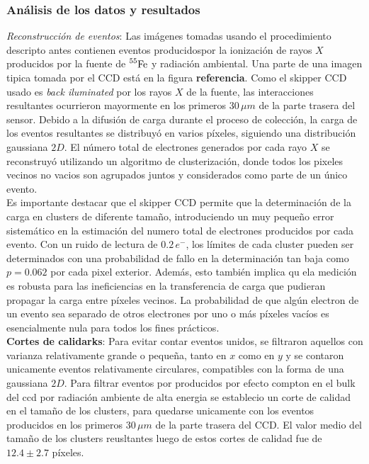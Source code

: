 \subsubsection{Análisis de los datos y resultados}
\textit{Reconstrucción de eventos}: Las imágenes tomadas usando el procedimiento descripto antes contienen eventos producidospor la ionización de rayos $X$ producidos por la fuente de $\prescript{55}{}{\mbox{Fe}}$ y radiación ambiental. Una parte de una imagen tipica tomada por el CCD está en la figura \textbf{referencia}. Como el skipper CCD usado es \textit{back iluminated} por los rayos $X$ de la fuente, las interacciones resultantes ocurrieron mayormente en los primeros $30\,\si{\mu m}$ de la parte trasera del sensor. Debido a la difusión de carga durante el proceso de colección, la carga de los eventos resultantes se distribuyó en varios píxeles, siguiendo una distribución gaussiana $2D$. El número total de electrones generados por cada rayo $X$ se reconstruyó utilizando un algoritmo de clusterización, donde todos los pixeles vecinos no vacios son agrupados juntos y considerados como parte de un único evento.\\
\indent Es importante destacar que el skipper CCD permite que la determinación de la carga en clusters de diferente tamaño, introduciendo un muy pequeño error sistemático en la estimación del numero total de electrones producidos por cada evento. Con un ruido de lectura de $0.2\,e^{-}$, los límites de cada cluster pueden ser determinados con una probabilidad de fallo en la determinación tan baja como $p = 0.062$ por cada pixel exterior. Además, esto también implica qu ela medición es robusta para las ineficiencias en la transferencia de carga que pudieran propagar la carga entre píxeles vecinos. La probabilidad de que algún electron de un evento sea separado de otros electrones por uno o más píxeles vacíos es esencialmente nula para todos los fines prácticos.\\
\indent \textbf{Cortes de calidarks}: Para evitar contar eventos unidos, se filtraron aquellos con varianza relativamente grande o pequeña, tanto en $x$ como en $y$ y se contaron unicamente eventos relativamente circulares, compatibles con la forma de una gaussiana $2D$. Para filtrar eventos por producidos por efecto compton en el bulk del ccd por radiación ambiente de alta energia se establecio un corte de calidad en el tamaño de los clusters, para quedarse unicamente con los eventos producidos en los primeros $30\,\si{\mu m}$ de la parte trasera del CCD. El valor medio del tamaño de los clusters reusltantes luego de estos cortes de calidad fue de $12.4 \pm 2.7$ píxeles.\\
